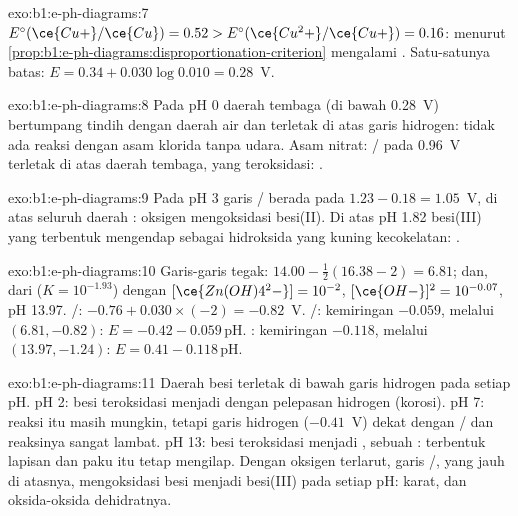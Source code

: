 \begin{solution}{exo:b1:e-ph-diagrams:7}
$E^\circ(\ce{Cu+}/\ce{Cu}) = 0.52 > E^\circ(\ce{Cu^2+}/\ce{Cu+}) = 0.16$:
menurut \cref{prop:b1:e-ph-diagrams:disproportionation-criterion} 
mengalami . Satu-satunya batas: $E = 0.34 + 0.030\log 0.010 =
0.28$~V.
\end{solution}

\begin{solution}{exo:b1:e-ph-diagrams:8}
Pada pH 0 daerah tembaga (di bawah 0.28~V) bertumpang tindih dengan
daerah air dan terletak di atas garis hidrogen: tidak ada reaksi dengan
asam klorida tanpa udara. Asam nitrat: / pada 0.96~V
terletak di atas daerah tembaga, yang teroksidasi:
.
\end{solution}

\begin{solution}{exo:b1:e-ph-diagrams:9}
Pada pH 3 garis / berada pada $1.23 - 0.18 = 1.05$~V, di
atas seluruh daerah : oksigen mengoksidasi besi(II). Di atas
pH 1.82 besi(III) yang terbentuk mengendap sebagai hidroksida yang kuning
kecokelatan: .
\end{solution}

\begin{solution}{exo:b1:e-ph-diagrams:10}
Garis-garis tegak: $14.00 - \frac12(16.38 - 2) = 6.81$; dan, dari
 ($K = 10^{-1.93}$) dengan
$[\ce{Zn(OH)4^2-}] = 10^{-2}$, $[\ce{OH-}]^2 = 10^{-0.07}$, pH 13.97.
/: $-0.76 + 0.030 \times (-2) = -0.82$~V. /:
kemiringan $-0.059$, melalui $(6.81, -0.82)$: $E = -0.42 - 0.059\,\mathrm{pH}$.
: kemiringan $-0.118$, melalui
$(13.97, -1.24)$: $E = 0.41 - 0.118\,\mathrm{pH}$.
\end{solution}

\begin{solution}{exo:b1:e-ph-diagrams:11}
Daerah besi terletak di bawah garis hidrogen pada setiap pH. pH 2: besi
teroksidasi menjadi  dengan pelepasan hidrogen (korosi). pH 7:
reaksi itu masih mungkin, tetapi garis hidrogen ($-0.41$~V) dekat dengan
/ dan reaksinya sangat lambat. pH 13: besi teroksidasi
menjadi , sebuah : terbentuk lapisan dan paku
itu tetap mengilap. Dengan oksigen terlarut, garis /, yang
jauh di atasnya, mengoksidasi besi menjadi besi(III) pada setiap pH:
karat,  dan oksida-oksida dehidratnya.
\end{solution}

